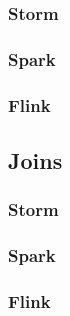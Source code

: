 

\subsubsection{Storm}







\subsubsection{Spark}







\subsubsection{Flink}






\subsection{Joins}

\subsubsection{Storm}

\subsubsection{Spark}



\subsubsection{Flink}






